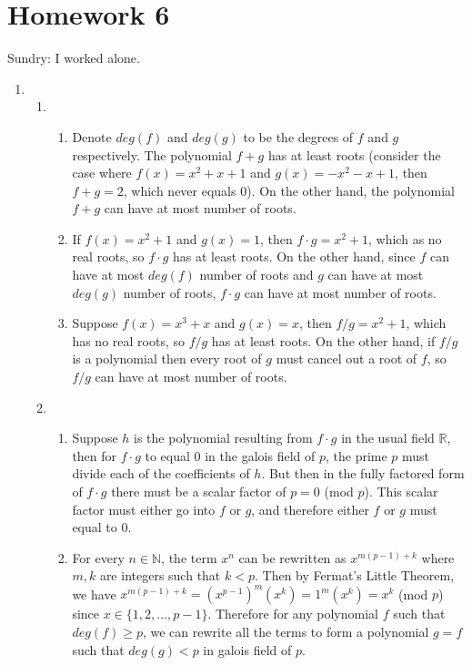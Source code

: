 \section{Homework 6}
Sundry: I worked alone.

\begin{enumerate}
    \item \begin{enumerate}
        \item \begin{enumerate}
            \item Denote $deg(f)$ and $deg(g)$ to be the degrees of $f$ and $g$ respectively. The polynomial $f + g$ has at least  roots (consider the case where $f(x) = x^2 + x + 1$ and $g(x) = -x^2 - x + 1$, then $f + g = 2$, which never equals 0). On the other hand, the polynomial $f + g$ can have at most  number of roots.
            
            \item If $f(x) = x^2 + 1$ and $g(x) = 1$, then $f \cdot g = x^2 + 1$, which as no real roots, so $f \cdot g$ has at least  roots. On the other hand, since $f$ can have at most $deg(f)$ number of roots and $g$ can have at most $deg(g)$ number of roots, $f \cdot g$ can have at most  number of roots.
            
            \item Suppose $f(x) = x^3 + x$ and $g(x) = x$, then $f / g = x^2 + 1$, which has no real roots, so $f / g$ has at least  roots. On the other hand, if $f / g$ is a polynomial then every root of $g$ must cancel out a root of $f$, so $f / g$ can have at most  number of roots.
            \end{enumerate}
            
        \item \begin{enumerate}
            \item {} Suppose $h$ is the polynomial resulting from $f \cdot g$ in the usual field $\mathbb{R}$, then for $f \cdot g$ to equal 0 in the galois field of $p$, the prime $p$ must divide each of the coefficients of $h$. But then in the fully factored form of $f \cdot g$ there must be a scalar factor of $p = 0$ (mod $p$). This scalar factor must either go into $f$ or $g$, and therefore either $f$ or $g$ must equal to 0.
            
            \item For every $n \in \mathbb{N}$, the term $x^n$ can be rewritten as $x^{m(p-1) + k}$ where $m, k$ are integers such that $k < p$. Then by Fermat's Little Theorem, we have $x^{m(p-1) + k} = (x^{p-1})^m (x^k) = 1^m (x^k) = x^k$ (mod $p$) since $x \in \{1, 2, \ldots, p-1\}$. Therefore for any polynomial $f$ such that $deg(f) \geq p$, we can rewrite all the terms to form a polynomial $g = f$ such that $deg(g) < p$ in galois field of $p$.
            

\end{enumerate}
\end{enumerate}
\end{enumerate}
